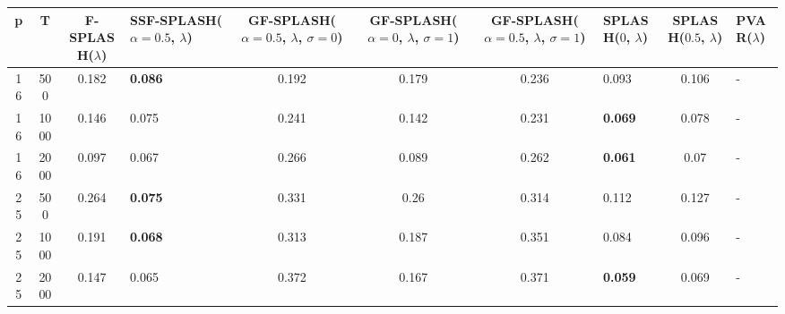 \begin{tabular}{ccclccclcl}
\hline
  p  &  T   &  F-SPLASH($\lambda$)  & SSF-SPLASH($\alpha=0.5$, $\lambda$)   &  GF-SPLASH($\alpha=0.5$, $\lambda$, $\sigma=0$)  &  GF-SPLASH($\alpha=0$, $\lambda$, $\sigma=1$)  &  GF-SPLASH($\alpha=0.5$, $\lambda$, $\sigma=1$)  & SPLASH($0$, $\lambda$)   &  SPLASH($0.5$, $\lambda$)  & PVAR($\lambda$)   \\
\hline
 16  & 500  &         0.182         & \textbf{0.086}                        &                      0.192                       &                     0.179                      &                      0.236                       & 0.093                    &           0.106            & -                 \\
 16  & 1000 &         0.146         & 0.075                                 &                      0.241                       &                     0.142                      &                      0.231                       & \textbf{0.069}           &           0.078            & -                 \\
 16  & 2000 &         0.097         & 0.067                                 &                      0.266                       &                     0.089                      &                      0.262                       & \textbf{0.061}           &            0.07            & -                 \\
 25  & 500  &         0.264         & \textbf{0.075}                        &                      0.331                       &                      0.26                      &                      0.314                       & 0.112                    &           0.127            & -                 \\
 25  & 1000 &         0.191         & \textbf{0.068}                        &                      0.313                       &                     0.187                      &                      0.351                       & 0.084                    &           0.096            & -                 \\
 25  & 2000 &         0.147         & 0.065                                 &                      0.372                       &                     0.167                      &                      0.371                       & \textbf{0.059}           &           0.069            & -                 \\
\hline
\end{tabular}